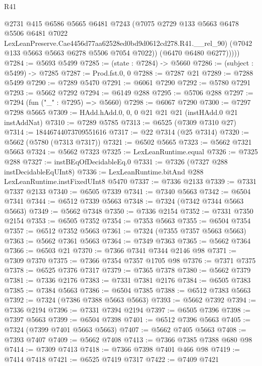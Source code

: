 \begin{lexlean}{R41}
\begin{coremodule}
              @2731
              @415
              @6586
              @5665
              @6481
              @7243
              (@7075
                @2729
                @133
                @5663
                @6478
                @5506
                @6481
                @7022
                LexLeanPreserve.Cae4456d77aa62528ed0bd9d0612cd278.R41.__rel_90)
              (@7042 @133 @5663 @5663 @6278 @5506 @7054 @7022))
            (@6470 @6480 @6277)))))
@7284 := @5693 @5499
@7285 := (state : @7284) -> @5660
@7286 := (subject : @5499) -> @7285
@7287 := Prod.fst.{0, 0}
@7288 := @7287 @21
@7289 := @7288 @5499
@7290 := @7289 @5470
@7291 := @6061 @7290
@7292 := @5780 @7291
@7293 := @5662 @7292
@7294 := @6149 @288
@7295 := @5706 @288
@7297 := @7294 (fun ("_" : @7295) => @5660)
@7298 := @6067 @7290
@7300 := @7297 @7298 @5665
@7309 := HAdd.hAdd.{0, 0, 0} @21 @21 @21 (instHAdd.{0} @21 instAddNat)
@7310 := @7289 @5785
@7313 := @6525 (@7309 @7310 @27)
@7314 := 18446744073709551616
@7317 := @22 @7314 (@25 @7314)
@7320 := @5662 (@5780 (@7313 @7317))
@7321 := @6502 @5665
@7323 := @5662 @7321 @5663
@7324 := @5662 @7323
@7325 := LexLeanRuntime.equal
@7326 := @7325 @288
@7327 := instBEqOfDecidableEq.{0}
@7331 := @7326 (@7327 @288 instDecidableEqUInt8)
@7336 := LexLeanRuntime.bitAnd @288 LexLeanRuntime.instFixedUInt8 @5470
@7337 := @7336 @2133
@7339 := @7331 @7337 @2133
@7340 := @6505 @7339
@7341 := @7340 @5663
@7342 := @6504 @7341
@7344 := @6512 @7339 @5663
@7348 := @7324 (@7342 @7344 @5663 @5663)
@7349 := @5662 @7348
@7350 := @7336 @2154
@7352 := @7331 @7350 @2154
@7353 := @6505 @7352
@7354 := @7353 @5663
@7355 := @6504 @7354
@7357 := @6512 @7352 @5663
@7361 := @7324 (@7355 @7357 @5663 @5663)
@7363 := @5662 @7361 @5663
@7364 := @7349 @7363
@7365 := @5662 @7364
@7366 := @6503 @21
@7370 := @7366 @7341 @7344 @2146 @98
@7371 := @7309 @7370
@7375 := @7366 @7354 @7357 @1705 @98
@7376 := @7371 @7375
@7378 := @6525 @7376 @7317
@7379 := @7365 @7378
@7380 := @5662 @7379
@7381 := @7336 @2176
@7383 := @7331 @7381 @2176
@7384 := @6505 @7383
@7385 := @7384 @5663
@7386 := @6504 @7385
@7388 := @6512 @7383 @5663
@7392 := @7324 (@7386 @7388 @5663 @5663)
@7393 := @5662 @7392
@7394 := @7336 @2194
@7396 := @7331 @7394 @2194
@7397 := @6505 @7396
@7398 := @7397 @5663
@7399 := @6504 @7398
@7401 := @6512 @7396 @5663
@7405 := @7324 (@7399 @7401 @5663 @5663)
@7407 := @5662 @7405 @5663
@7408 := @7393 @7407
@7409 := @5662 @7408
@7413 := @7366 @7385 @7388 @680 @98
@7414 := @7309 @7413
@7418 := @7366 @7398 @7401 @466 @98
@7419 := @7414 @7418
@7421 := @6525 @7419 @7317
@7422 := @7409 @7421

\end{coremodule}
\end{lexlean}
